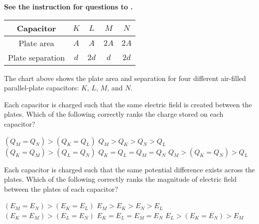 \textbf{See the instruction for questions  to .}

\begin{table}[H]
    \centering
    \begin{tabular}{|c|c|c|c|c|}
    \hline Capacitor & $K$ & $L$ & $M$ & $N$ \\
    \hline Plate area & $A$ & $A$ & $2 A$ & $2 A$ \\
    \hline Plate separation & $d$ & $2 d$ & $d$ & $2 d$ \\
    \hline
    \end{tabular}
\end{table}

The chart above shows the plate area and separation for four different air-filled parallel-plate capacitors: $K$, $L$, $M$, and $N$.

\begin{questions}\setcounter{question}{11}\question
Each capacitor is charged such that the same electric field is created between the plates. Which of the following correctly ranks the charge stored on each capacitor?

\begin{choices}
\choice $\left(Q_{M}=Q_{N}\right)>\left(Q_{K}=Q_{L}\right)$
\choice $Q_{M}>Q_{K}>Q_{N}>Q_{L}$
\choice $\left(Q_{K}=Q_{M}\right)>\left(Q_{L}=Q_{N}\right)$
\choice $Q_{K}=Q_{L}=Q_{M}=Q_{N}$
\choice $Q_{M}>\left(Q_{K}=Q_{N}\right)>Q_{L}$
\end{choices}\end{questions}

\begin{questions}\setcounter{question}{12}\question
Each capacitor is charged such that the same potential difference exists across the plates. Which of the following correctly ranks the magnitude of electric field between the plates of each capacitor?

\begin{choices}
\choice $\left(E_{M}=E_{N}\right)>\left(E_{K}=E_{L}\right)$
\choice $E_{M}>E_{K}>E_{N}>E_{L}$
\choice $\left(E_{K}=E_{M}\right)>\left(E_{L}=E_{N}\right)$
\choice $E_{K}=E_{L}=E_{M}=E_{N}$
\choice $E_{L}>\left(E_{K}=E_{N}\right)>E_{M}$
\end{choices}\end{questions}

